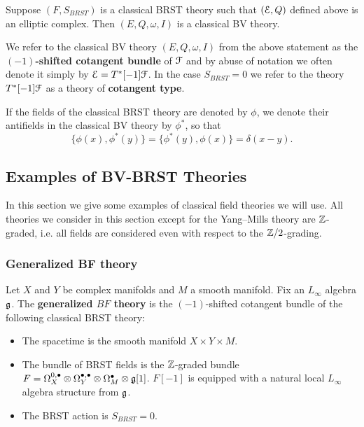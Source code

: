 \documentclass[10pt, oneside]{article}
\begin{document}
\begin{lemma}
Suppose $(F, S_{BRST})$ is a classical BRST theory such that $(\mathcal E, Q)$ defined above is an elliptic complex. Then $(E, Q, \omega, I)$ is a classical BV theory.
\end{lemma}

We refer to the classical BV theory $(E, Q, \omega, I)$ from the above statement as the {\bf $(-1)$-shifted cotangent bundle} of $\mathcal F$ and by abuse of notation we often denote it simply by $\mathcal E = T^*[-1] \mathcal F$. In the case $S_{BRST} = 0$ we refer to the theory $T^*[-1] \mathcal F$ as a theory of {\bf cotangent type}.

If the fields of the classical BRST theory are denoted by $\phi$, we denote their antifields in the classical BV theory by $\phi^*$, so that
\[\{\phi(x), \phi^*(y)\} = \{\phi^*(y), \phi(x)\} = \delta(x-y).\]

\subsection{Examples of BV-BRST Theories}

In this section we give some examples of classical field theories we will use. All theories we consider in this section except for the Yang--Mills theory are $\mathbb Z$-graded, i.e. all fields are considered even with respect to the $\mathbb Z/2$-grading.

\subsubsection{Generalized BF theory} \label{gen_BF_section}

\begin{definition}
Let $X$ and $Y$ be complex manifolds and $M$ a smooth manifold. Fix an $L_\infty$ algebra $\mathfrak g$. The {\bf generalized $BF$ theory} is the $(-1)$-shifted cotangent bundle of the following classical BRST theory:
\begin{itemize}
\item The spacetime is the smooth manifold $X\times Y\times M$.

\item The bundle of BRST fields is the $\mathbb Z$-graded bundle $F = \Omega^{0,\bullet}_X \otimes \Omega^{\bullet,\bullet}_Y \otimes \Omega^\bullet_M \otimes \mathfrak g[1]$. $F[-1]$ is equipped with a natural local $L_\infty$ algebra structure from $\mathfrak g$.

\item The BRST action is $S_{BRST} = 0$.
\end{itemize}
\end{definition}
\end{document}
